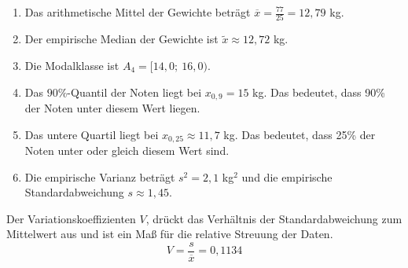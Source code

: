\documentclass[main.tex]{subfiles}
\begin{document}
\renewcommand{\labelenumi}{\theenumi}
\renewcommand{\theenumi}{\roman{enumi}.}%
\begin{enumerate}
    \item Das arithmetische Mittel der Gewichte beträgt $\overline{x}=\frac{77}{25} = 12,79$ kg.
    \item Der empirische Median der Gewichte ist $\tilde{x}\approx 12,72$ kg.
    \item Die Modalklasse ist $A_4 = [14,0;\  16,0)$.
    \item Das $90\%$-Quantil der Noten liegt bei $x_{0,9} = 15$ kg. Das bedeutet, dass 90\% der Noten unter diesem Wert liegen.
    \item Das untere Quartil liegt bei $x_{0,25} \approx 11,7$ kg. Das bedeutet, dass 25\% der Noten unter oder gleich diesem Wert sind.
    \item Die empirische Varianz beträgt $s^2 = 2,1$ kg$^2$ und die empirische Standardabweichung $s \approx 1,45$.
\end{enumerate}

Der Variationskoeffizienten $V$, drückt das Verhältnis der Standardabweichung zum Mittelwert aus und ist ein Maß für die relative Streuung der Daten.
$$
    V = \frac{s}{\overline{x}} = 0,1134
$$
\end{document}
